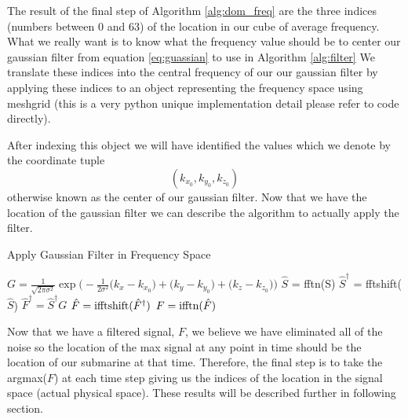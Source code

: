 \documentclass[11pt]{amsart}
\begin{document}
The result of the final step of Algorithm \ref{alg:dom_freq} are the three indices (numbers between 0 and 63) of the location in our cube of average frequency.
What we really want is to know what the frequency value should be to center our gaussian filter from equation \ref{eq:guassian} to use in Algorithm \ref{alg:filter}
We translate these indices into the central frequency of our our gaussian filter by applying these indices to an object representing the frequency space using meshgrid (this is a very python unique implementation detail please refer to code directly).

After indexing this object we will have identified the values which we denote by the coordinate tuple
\begin{equation}(k_{x_0}, k_{y_0}, k_{z_0}) \label{eq:filter_loc} \end{equation}
otherwise known as the center of our gaussian filter.
Now that we have the location of the gaussian filter we can describe the algorithm to actually apply the filter.

\begin{algorithm}
\caption{Apply Gaussian Filter in Frequency Space}\label{alg:filter}
\begin{algorithmic}
\State $ G = \frac {1}{\sqrt{2 \pi \sigma^2}}\exp \Big( - \frac{1}{2 \sigma^2 }\big(k_x - k_{x_0}\big) + \big(k_y - k_{y_0}\big) + \big(k_z - k_{z_0}\big) \Big)$ 
\State $\hat S$ = fftn(S)
\State $\hat S^\dag$ = fftshift($\hat S$)
\State $\hat F^\dag = \hat S^\dag G$ 
\State $\hat F = {\rm ifftshift}(\hat F^\dag)$
\State $F = {\rm ifftn}(\hat F)$ 
\end{algorithmic}
\end{algorithm}

Now that we have a filtered signal, $F$, we believe we have eliminated all of the noise so the location of the max signal at any point in time should be the location of our submarine at that time.
Therefore, the final step is to take the argmax($F$) at each time step giving us the indices of the location in the signal space (actual physical space). These results will be described further in following section.
\end{document}
